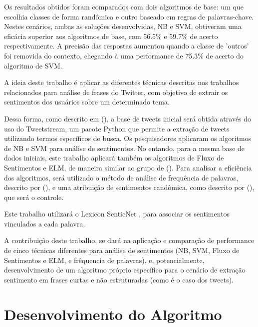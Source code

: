 \documentclass[
	12pt,				%
	openright,			%
	oneside,			%
	a4paper,			%
	english,			%
	spanish,			%
	brazil				%
	]{abntex2}
\begin{document}
Os resultados obtidos foram comparados com dois algoritmos de base: um que escolhia classes de forma randômica e outro baseado em regras de palavras-chave. Nestes cenários, ambas as soluções desenvolvidas, NB e SVM, obtiveram uma eficácia superior aos algoritmos de base, com 56.5\% e 59.7\% de acerto respectivamente. A precisão das respostas aumentou quando a classe de 'outros' foi removida do contexto, chegando à uma performance de 75.3\% de acerto do algoritmo de SVM. 

	A ideia deste trabalho é aplicar as diferentes técnicas descritas nos trabalhos relacionados para análise de frases do Twitter, com objetivo de extrair os sentimentos dos usuários sobre um determinado tema.  

	Dessa forma, como descrito em  (\citeyear{article_tweet_crisis}), a base de tweets inicial será obtida através do uso do Tweetstream, um pacote Python que permite a extração de tweets utilizando termos específicos de busca. Os pesquisadores aplicaram os algoritmos de NB e SVM para análise de sentimentos. No entando, para a mesma base de dados iniciais, este trabalho aplicará também os algoritmos de Fluxo de Sentimentos e ELM, de maneira similar ao grupo de  (\citeyear{article_sentiment_analysis}). Para analisar a eficiência dos algoritmos, será utilizado o método de análise de frequência de palavras, descrito por  (\citeyear{article_Tsugawa2013}), e uma atribuição de sentimentos randômica, como descrito por  (\citeyear{article_tweet_crisis}), que será o controle. 

Este trabalho utilizará o Lexicon SenticNet \cite{article_Poria2014}, para associar os sentimentos vinculados a cada palavra.

A contribuição deste trabalho, se dará na aplicação e comparação de performance de cinco técnicas diferentes para análise de sentimentos (NB, SVM, Fluxo de Sentimentos e ELM, e frêquencia de palavras), e, potencialmente, desenvolvimento de um algoritmo próprio específico para o cenário de extração sentimento em frases curtas e não estruturadas (como é o caso dos tweets).


	
	\chapter{Desenvolvimento do Algoritmo}
\end{document}
